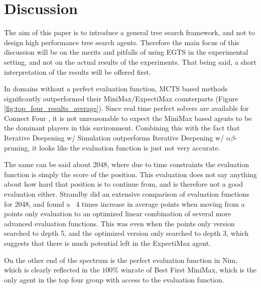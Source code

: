 \section{Discussion}

The aim of this paper is to introduce a general tree search framework, and not to design high performance tree search agents. Therefore the main focus of this discussion will be on the merits and pitfalls of using EGTS in the experimental setting, and not on the actual results of the experiments. That being said, a short interpretation of the results will be offered first.

In domains without a perfect evaluation function, MCTS based methods significantly outperformed their MiniMax/ExpectiMax counterparts (Figure \ref{fig:top_four_results_average}). Since real time perfect solvers are available for Connect Four \cite{Pons2019}, it is not unreasonable to expect the MiniMax based agents to be the dominant players in this environment. Combining this with the fact that Iterative Deepening w/ Simulation outperforms Iterative Deepening w/ $\alpha\beta$-pruning, it looks like the evaluation function is just not very accurate.

The same can be said about 2048, where due to time constraints the evaluation function is simply the score of the position. This evaluation does not say anything about how hard that position is to continue from, and is therefore not a good evaluation either. Strandby \cite{Strandby2016} did an extensive comparison of evaluation functions for 2048, and found a ~4 times increase in average points when moving from a points only evaluation to an optimized linear combination of several more advanced evaluation functions. This was even when the points only version searched to depth 5, and the optimized version only searched to depth 3, which suggests that there is much potential left in the ExpectiMax agent.

On the other end of the spectrum is the perfect evaluation function in Nim, which is clearly reflected in the $100\%$ winrate of Best First MiniMax, which is the only agent in the top four group with access to the evaluation function.

